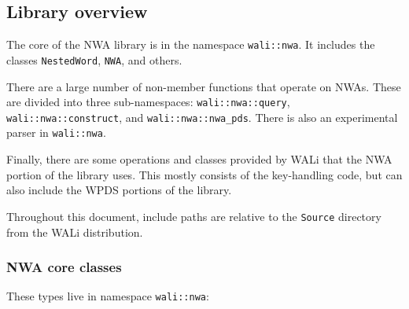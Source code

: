 \subsection{Library overview}

The core of the NWA library is in the namespace \texttt{wali::nwa}. It
includes the classes \texttt{NestedWord}, \texttt{NWA}, and others.

There are a large number of non-member functions that operate on NWAs. These
are divided into three sub-namespaces:
\texttt{wali::nwa::query}, \texttt{wali::nwa::construct}, and
\texttt{wali::nwa::nwa\_pds}. There is also an experimental parser in
\texttt{wali::nwa}.

Finally, there are some operations and classes provided by WALi that the NWA
portion of the library uses. This mostly consists of the key-handling code,
but can also include the WPDS portions of the library.

Throughout this document, include paths are relative to the \texttt{Source}
directory from the WALi distribution.

\subsubsection{NWA core classes}

These types live in namespace \texttt{wali::nwa}:

